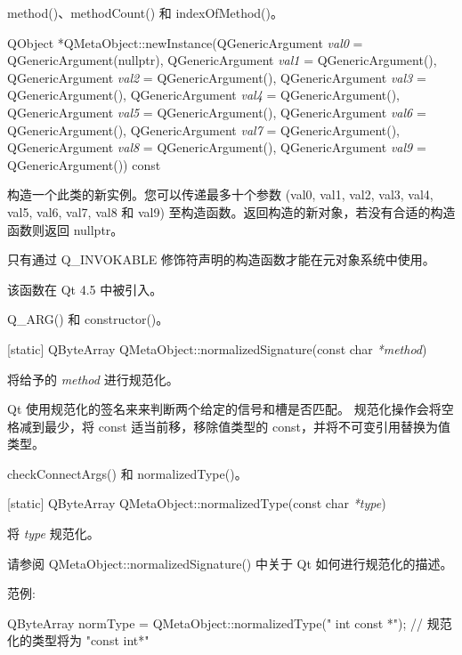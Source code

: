 \begin{seeAlso}
method()、methodCount() 和 indexOfMethod()。
\end{seeAlso}

QObject *QMetaObject::newInstance(QGenericArgument \emph{val0} = QGenericArgument(nullptr), QGenericArgument \emph{val1} = QGenericArgument(), 
    QGenericArgument \emph{val2} = QGenericArgument(), QGenericArgument \emph{val3} = QGenericArgument(), 
    QGenericArgument \emph{val4} = QGenericArgument(), QGenericArgument \emph{val5} = QGenericArgument(), 
    QGenericArgument \emph{val6} = QGenericArgument(), QGenericArgument \emph{val7} = QGenericArgument(), 
    QGenericArgument \emph{val8} = QGenericArgument(), QGenericArgument \emph{val9} = QGenericArgument()) const

构造一个此类的新实例。您可以传递最多十个参数 (val0, val1, val2, val3, val4, val5, val6, val7, val8 和 val9) 至构造函数。返回构造的新对象，若没有合适的构造函数则返回 nullptr。

\begin{notice}
只有通过 Q\_INVOKABLE 修饰符声明的构造函数才能在元对象系统中使用。
\end{notice}

该函数在 Qt 4.5 中被引入。

\begin{seeAlso}
Q\_ARG() 和 constructor()。
\end{seeAlso}

[static] QByteArray QMetaObject::normalizedSignature(const char \emph{*method})

将给予的 \emph{method} 进行规范化。

Qt 使用规范化的签名来来判断两个给定的信号和槽是否匹配。
规范化操作会将空格减到最少，将 const 适当前移，移除值类型的 const，并将不可变引用替换为值类型。

\begin{seeAlso}
checkConnectArgs() 和 normalizedType()。
\end{seeAlso}

[static] QByteArray QMetaObject::normalizedType(const char \emph{*type})

将 \emph{type} 规范化。

请参阅 QMetaObject::normalizedSignature() 中关于 Qt 如何进行规范化的描述。

范例:

\begin{cppcode}
 QByteArray normType = QMetaObject::normalizedType(" int    const  *");
 // 规范化的类型将为 "const int*"
\end{cppcode}

